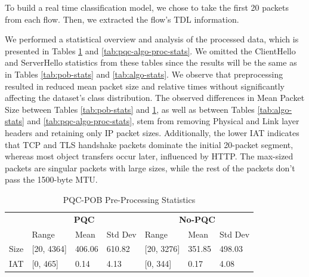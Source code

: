 \documentclass[10pt,journal]{IEEEtran}%
\begin{document}
 To build a real time classification model, we chose to take the first 20 packets from each flow. Then, we extracted the flow's TDL information. 

We performed a statistical overview and analysis of the processed data, which is presented in Tables \ref{tab:pqc-pob-proc-stats} and \ref{tab:pqc-algo-proc-stats}.
We omitted the ClientHello and ServerHello statistics from these tables since the results will be the same as in Tables \ref{tab:pob-stats} and \ref{tab:algo-stats}. We observe that preprocessing resulted in reduced mean packet size and relative times without significantly affecting the dataset's class distribution. The observed differences in Mean Packet Size between Tables \ref{tab:pob-stats} and \ref{tab:pqc-pob-proc-stats}, as well as between Tables \ref{tab:algo-stats} and \ref{tab:pqc-algo-proc-stats},  stem from removing Physical and Link layer headers and retaining only IP packet sizes. Additionally, the lower IAT indicates that TCP and TLS handshake packets dominate the initial 20-packet segment, whereas most object transfers occur later, influenced by HTTP.
The max-sized packets are singular packets with large sizes, while the rest of the packets don't pass the 1500-byte MTU.

\begin{table} \caption{PQC-POB Pre-Processing Statistics} \label{tab:pqc-pob-proc-stats} \centering \begin{tabular}{l|lll|lll|} \cline{2-7} & \multicolumn{3}{c|}{\textbf{PQC}} & \multicolumn{3}{c|}{\textbf{No-PQC}} \\ \cline{2-7} & \multicolumn{1}{l|}{Range} & \multicolumn{1}{l|}{Mean} & Std Dev & \multicolumn{1}{l|}{Range} & \multicolumn{1}{l|}{Mean} & Std Dev \\ \hline \multicolumn{1}{|l|}{Size} & \multicolumn{1}{l|}{{[}20, 4364{]}} & \multicolumn{1}{l|}{406.06} & 610.82 & \multicolumn{1}{l|}{{[}20, 3276{]}} & \multicolumn{1}{l|}{351.85} & 498.03 \\ \hline \multicolumn{1}{|l|}{IAT} & \multicolumn{1}{l|}{{[}0, 465{]}} & \multicolumn{1}{l|}{0.14} & 4.13 & \multicolumn{1}{l|}{{[}0, 344{]}} & \multicolumn{1}{l|}{0.17} & 4.08 \\ \hline \end{tabular} \end{table}
\end{document}
